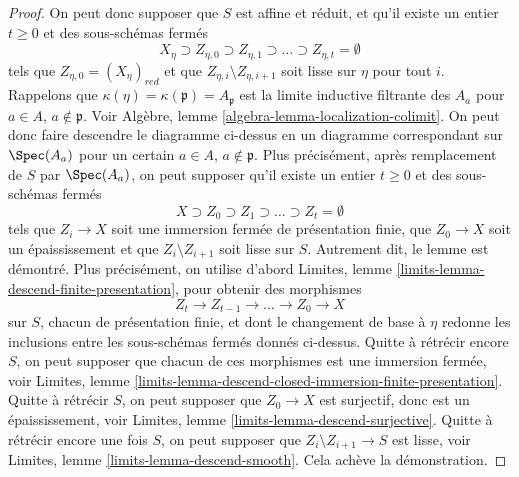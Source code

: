 \begin{proof}
\medskip\noindent
On peut donc supposer que $S$ est affine et réduit, et qu'il existe un entier $t \geq 0$
et des sous-schémas fermés
$$
X_\eta \supset Z_{\eta, 0} \supset Z_{\eta, 1}
\supset \ldots \supset Z_{\eta, t} = \emptyset
$$
tels que $Z_{\eta, 0} = (X_\eta)_{red}$ et que
$Z_{\eta, i} \setminus Z_{\eta, i + 1}$
soit lisse sur $\eta$ pour tout $i$.
Rappelons que $\kappa(\eta) = \kappa(\mathfrak p) = A_\mathfrak p$ est
la limite inductive filtrante des $A_a$ pour $a \in A$, $a \not \in \mathfrak p$.
Voir Algèbre, lemme \ref{algebra-lemma-localization-colimit}.
On peut donc faire descendre le diagramme ci-dessus en un diagramme correspondant
sur $\Spec(A_a)$ pour un certain $a \in A$, $a \not \in \mathfrak p$.
Plus précisément, après remplacement de $S$ par $\Spec(A_a)$,
on peut supposer qu'il existe un entier $t \geq 0$ et des sous-schémas fermés
$$
X \supset Z_0 \supset Z_1 \supset \ldots \supset Z_t = \emptyset
$$
tels que $Z_i \to X$ soit une immersion fermée de présentation finie,
que $Z_0 \to X$ soit un épaississement et que $Z_i \setminus Z_{i + 1}$
soit lisse sur $S$. Autrement dit, le lemme est démontré.
Plus précisément, on utilise d'abord
Limites, lemme \ref{limits-lemma-descend-finite-presentation},
pour obtenir des morphismes
$$
Z_t \to Z_{t - 1} \to \ldots \to Z_0 \to X
$$
sur $S$, chacun de présentation finie, et dont le
changement de base à $\eta$ redonne les inclusions entre les
sous-schémas fermés donnés ci-dessus. Quitte à rétrécir encore $S$, on peut supposer
que chacun de ces morphismes est une immersion fermée, voir
Limites, lemme
\ref{limits-lemma-descend-closed-immersion-finite-presentation}.
Quitte à rétrécir $S$, on peut supposer que $Z_0 \to X$ est surjectif,
donc est un épaississement, voir
Limites, lemme \ref{limits-lemma-descend-surjective}.
Quitte à rétrécir encore une fois $S$, on peut supposer que
$Z_i \setminus Z_{i + 1} \to S$ est lisse, voir
Limites, lemme \ref{limits-lemma-descend-smooth}.
Cela achève la démonstration.
\end{proof}

